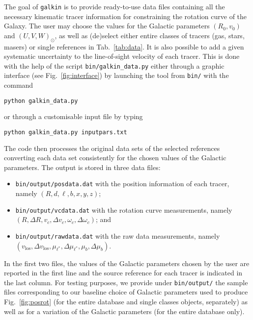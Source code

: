 \documentclass[twocolumn,prd,reprint,preprintnumbers,amsmath,amssymb,superscriptaddress,nofootinbib]{revtex4}
\begin{document}
\par The goal of \texttt{galkin} is to provide ready-to-use data files containing all the necessary kinematic tracer information for constraining the rotation curve of the Galaxy. The user may choose the values for the Galactic parameters $(R_0,v_0)$ and $(U,V,W)_{\odot}$, as well as (de)select either entire classes of tracers (gas, stars, masers) or single references in Tab.~\ref{tab:data}. It is also possible to add a given systematic uncertainty to the line-of-sight velocity of each tracer. This is done with the help of the script \texttt{bin/galkin\_data.py} either through a graphic interface (see Fig.~\ref{fig:interface}) by launching the tool from \texttt{bin/} with the command
\vspace{0.1cm}
\par \texttt{python galkin\_data.py}
\vspace{0.15cm}
\par \hspace{-0.5cm} or through a customisable input file by typing
\vspace{0.1cm}
\par \texttt{python galkin\_data.py inputpars.txt}
\vspace{0.15cm}
\par \hspace{-0.5cm} The code then processes the original data sets of the selected references converting each data set consistently for the chosen values of the Galactic parameters. The output is stored in three data files:
\vspace{-0.2cm}
\begin{itemize}[leftmargin=*] \itemsep0pt \parskip0pt 
\item[] \texttt{bin/output/posdata.dat} with the position information of each tracer, namely $(R,d,\ell,b,x,y,z)$;
\item[] \texttt{bin/output/vcdata.dat} with the rotation curve measurements, namely $(R,\Delta R,v_c,\Delta v_c,\omega_c,\Delta \omega_c)$; and
\item[] \texttt{bin/output/rawdata.dat} with the raw data measurements, namely $(v_\text{los},\Delta v_\text{los}, \mu_{\ell^\ast},\Delta \mu_{\ell^\ast}, \mu_b, \Delta \mu_b)$.
\end{itemize}
\vspace{-0.2cm}
In the first two files, the values of the Galactic parameters chosen by the user are reported in the first line and the source reference for each tracer is indicated in the last column. For testing purposes, we provide under \texttt{bin/output/} the sample files corresponding to our baseline choice of Galactic parameters used to produce Fig.~\ref{fig:posrot} (for the entire database and single classes objects, separately) as well as for a variation of the Galactic parameters (for the entire database only).
\end{document}
